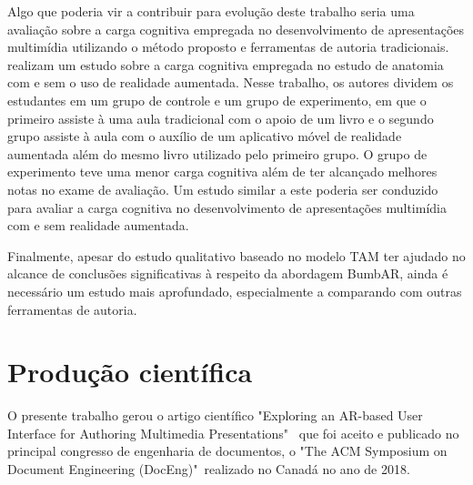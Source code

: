 \documentclass[../main.tex]{subfiles}
\begin{document}
Algo que poderia vir a contribuir para evolução deste trabalho seria uma avaliação sobre a carga cognitiva empregada no desenvolvimento de apresentações multimídia utilizando o método proposto e ferramentas de autoria tradicionais.  realizam um estudo sobre a carga cognitiva empregada no estudo de anatomia com e sem o uso de realidade aumentada. Nesse trabalho, os autores dividem os estudantes em um grupo de controle e um grupo de experimento, em que o primeiro assiste à uma aula tradicional com o apoio de um livro e o segundo grupo assiste à aula com o auxílio de um aplicativo móvel de realidade aumentada além do mesmo livro utilizado pelo primeiro grupo. O grupo de experimento teve uma menor carga cognitiva além de ter alcançado melhores notas no exame de avaliação. Um estudo similar a este poderia ser conduzido para avaliar a carga cognitiva no desenvolvimento de apresentações multimídia com e sem realidade aumentada.

Finalmente, apesar do estudo qualitativo baseado no modelo TAM ter ajudado no alcance de conclusões significativas à respeito da abordagem BumbAR, ainda é necessário um estudo mais aprofundado, especialmente a comparando com outras ferramentas de autoria.

\section{Produção científica}

O presente trabalho gerou o artigo científico "Exploring an AR-based User Interface for Authoring Multimedia Presentations"~\cite{mendes2018exploring} que foi aceito e publicado no principal congresso de engenharia de documentos, o "The ACM Symposium on Document Engineering (DocEng)"~realizado no Canadá no ano de 2018. 
\end{document}
